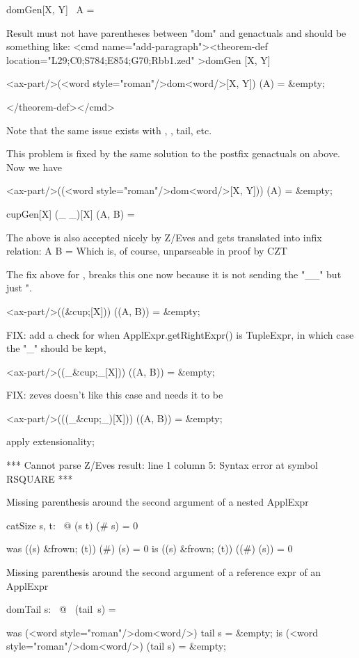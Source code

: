 \begin{theorem}{domGen}[X, Y]
     \dom[X, Y]~A = \emptyset
\end{theorem}
 Result must not have parentheses between "dom" and genactuals and should be something like:
<cmd name="add-paragraph"><theorem-def location="L29;C0;S784;E854;G70;Rbb1.zed"   >domGen
[X, Y]

<ax-part/>(<word style="roman"/>dom<word/>[X, Y]) (A)  =  &empty;

</theorem-def></cmd>

 Note that the same issue exists with \bigcap, \bigcup, tail, etc.

This problem is fixed by the same solution to the postfix genactuals on \inv above. Now we have

<ax-part/>((<word style="roman"/>dom<word/>[X, Y])) (A)  =  &empty;

\begin{theorem}{cupGen}[X]
    (\_ \cup \_)[X] (A, B) = \emptyset
\end{theorem}
 The above is also accepted nicely by Z/Eves and gets translated into infix relation:
  A \cup[X] B = \emptyset
 Which is, of course, unparseable in proof by CZT

The fix above for \inv, breaks this one now because it is not sending the "_\cup_" but just "\cup.

<ax-part/>((&cup;[X])) ((A, B))  =  &empty;

FIX: add a check for when ApplExpr.getRightExpr() is TupleExpr, in which case the "_" should be kept,

<ax-part/>((_&cup;_[X])) ((A, B))  =  &empty;

FIX: zeves doesn't like this case and needs it to be

<ax-part/>(((_&cup;_)[X])) ((A, B))  =  &empty;

\begin{zproof}[cupGen]
   apply extensionality;
\end{zproof}
***
Cannot parse Z/Eves result:
line 1 column 5: Syntax error at symbol RSQUARE
***

Missing parenthesis around the second argument of a nested ApplExpr
\begin{theorem}{catSize}
\forall  s, t: \seq~\nat @ (s \cat  t) (\# s) = 0
\end{theorem}
was ((s) &frown; (t)) (#) (s)  =  0
is  ((s) &frown; (t)) ((#) (s))  =  0

Missing parenthesis around the second argument of a reference expr of an ApplExpr
\begin{theorem}{domTail}
\forall  s: \seq~\nat @ \dom~(tail~s) = \emptyset
\end{theorem}
was (<word style="roman"/>dom<word/>) tail s  =  &empty;
is  (<word style="roman"/>dom<word/>) (tail s)  =  &empty;